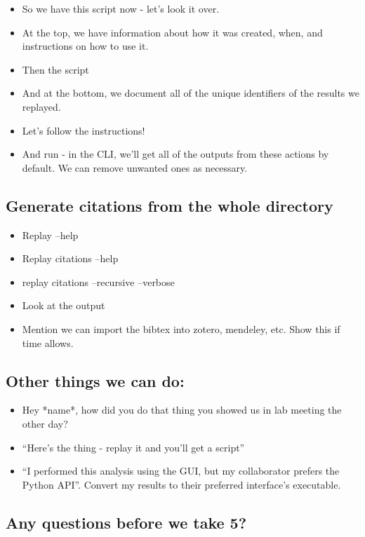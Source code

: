 \begin{itemize}
    \item So we have this script now - let’s look it over.
    \item At the top, we have information about how it was created, when, and instructions on how to use it.
    \item Then the script
    \item And at the bottom, we document all of the unique identifiers of the results we replayed.
    \item Let’s follow the instructions!
    \item And run - in the CLI, we’ll get all of the outputs from these actions by default. We can remove unwanted ones as necessary.
\end{itemize}

\subsection*{Generate citations from the whole directory}

\begin{itemize}
    \item Replay –help
    \item Replay citations –help
    \item replay citations –recursive –verbose
    \item Look at the output
    \item Mention we can import the bibtex into zotero, mendeley, etc. Show this if time allows.
\end{itemize}

\subsection*{Other things we can do:}

\begin{itemize}
    \item Hey *name*, how did you do that thing you showed us in lab meeting the other day?
    \item “Here’s the thing - replay it and you’ll get a script”
    \item “I performed this analysis using the GUI, but my collaborator prefers the Python API”. Convert my results to their preferred interface’s executable.
\end{itemize}

\subsection*{Any questions before we take 5?}


